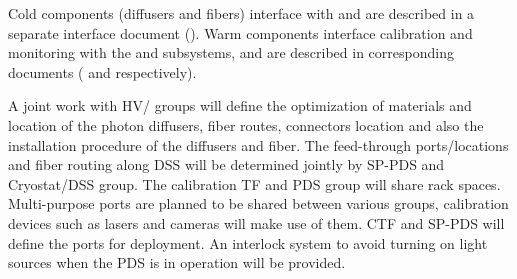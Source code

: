 Cold components (diffusers and fibers) interface with  and are described in a separate interface document (). Warm components interface calibration and monitoring  with the  and  subsystems, and are described in corresponding documents ( and  respectively).


A joint work with HV/ groups will define the optimization of materials and location of the photon diffusers, fiber routes, connectors location and also the installation procedure of the diffusers and fiber. The feed-through ports/locations and fiber routing along DSS will be determined jointly by SP-PDS and Cryostat/DSS group. The calibration TF and PDS group will share rack spaces. Multi-purpose ports are planned to be shared between various groups, calibration devices such as lasers and cameras will make use of them. CTF and SP-PDS will define the ports for deployment. An interlock system to avoid turning on light sources when the PDS is in operation will be provided.







